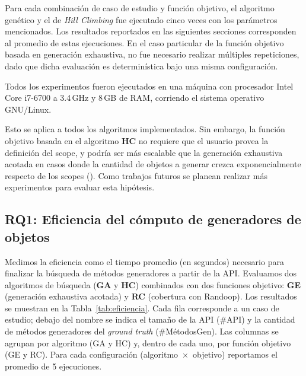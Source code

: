 Para cada combinación de caso de estudio y función objetivo, el algoritmo
genético y el de \emph{Hill Climbing} fue ejecutado cinco veces con los parámetros mencionados. Los
resultados reportados en las siguientes secciones corresponden al promedio de
estas ejecuciones. En el caso particular de la función objetivo basada en
generación exhaustiva, no fue necesario realizar múltiples repeticiones, dado
que dicha evaluación es determinística bajo una misma configuración.

Todos los experimentos fueron ejecutados en una máquina con procesador Intel
Core i7-6700 a 3.4\,GHz y 8\,GB de RAM, corriendo el sistema operativo
GNU/Linux.


%

Esto se aplica a todos los algoritmos implementados.
Sin embargo, la función objetivo basada en el algoritmo \textbf{HC} no requiere que el usuario provea la definición del scope, y
podría ser más escalable que la generación exhaustiva acotada en casos donde
la cantidad de objetos a generar crezca exponencialmente respecto de los scopes 
(). Como trabajos futuros se planean realizar más experimentos 
para evaluar esta hipótesis.


\subsection{RQ1: Eficiencia del cómputo de generadores de objetos}
Medimos la eficiencia como el tiempo promedio (en segundos) necesario para
finalizar la búsqueda de métodos generadores a partir de la API. Evaluamos dos
algoritmos de búsqueda (\textbf{GA} y \textbf{HC}) combinados con dos funciones
objetivo: \textbf{GE} (generación exhaustiva acotada) y \textbf{RC} (cobertura con
Randoop). Los resultados se muestran en la Tabla~\ref{tab:eficiencia}. Cada fila
corresponde a un caso de estudio; debajo del nombre se indica el tamaño de la API
(\#API) y la cantidad de métodos generadores del \emph{ground truth}
(\#MétodosGen). Las columnas se agrupan por algoritmo (GA y HC) y, dentro de
cada uno, por función objetivo (GE y RC). Para cada configuración
(algoritmo~$\times$~objetivo) reportamos el promedio de 5 ejecuciones.


